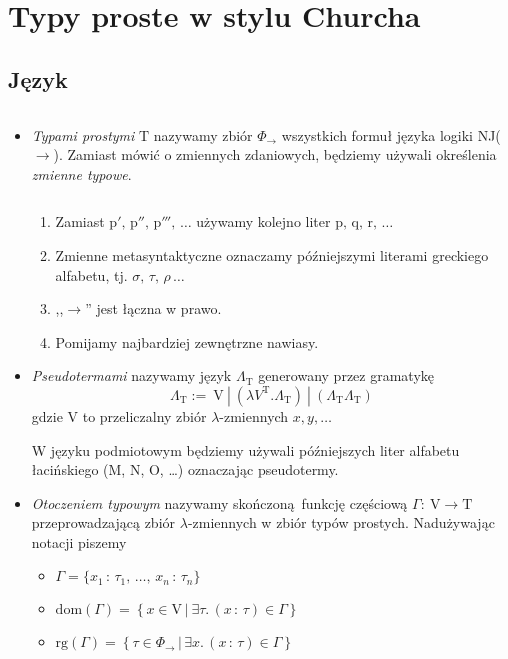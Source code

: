 \section{Typy proste w stylu Churcha}

\subsection{Język}

\begin{definicja}$ $\newline
\begin{itemize}
\item
  \emph{Typami prostymi} \(\mathrm{T}\) nazywamy zbiór \(\Phi_{\to}\) wszystkich formuł języka logiki NJ(\(\to\)). 
    Zamiast mówić o zmiennych zdaniowych, będziemy używali określenia \emph{zmienne typowe}.

\begin{konwencja*}$ $\newline 
  \begin{enumerate}
    \item Zamiast \(\mathrm{p'},\, \mathrm{p''},\, \mathrm{p'''},\, \dots\) używamy kolejno liter \(\mathrm{p},\, \mathrm{q},\, \mathrm{r},\, \dots\)
    \item Zmienne metasyntaktyczne oznaczamy późniejszymi literami greckiego alfabetu, tj. \(\sigma,\, \tau,\, \rho\,\dots\)
    \item ,,\(\rightarrow\)'' jest łączna w prawo.
    \item Pomijamy najbardziej zewnętrzne nawiasy.
  \end{enumerate}
\end{konwencja*}

\item
  \emph{Pseudotermami} nazywamy język \(\Lambda_{\mathrm{T}}\) generowany przez
gramatykę 
\[
  \Lambda_{\mathrm{T}} := \ \mathrm{V}\ | \ \left (\lambda V^{\mathrm{T}} . \Lambda_{\mathrm{T}}\right) \ | \ \left (\Lambda_{\mathrm{T}}\Lambda_{\mathrm{T}}\right)
\]
    gdzie V to przeliczalny zbiór \(\lambda\)-zmiennych \(x, y, \dots\)
    
    W języku podmiotowym będziemy używali późniejszych liter alfabetu łacińskiego (M, N, O, …) oznaczając pseudotermy.
  \item \emph{Otoczeniem typowym} nazywamy skończoną funkcję częściową \(\Gamma:\:\mathrm{V}\to\mathrm{T}\) przeprowadzającą zbiór \(\lambda\)-zmiennych w zbiór typów prostych. Nadużywając notacji piszemy
    \begin{itemize}
      \item \(\Gamma=\{x_1\,:\,\tau_1,\,\dots,\,x_n\,:\,\tau_n\}\)
      \item \(\mathrm{dom}(\Gamma) = \left\{x\in \mathrm{V}\,|\:\exists\tau.\,(x\,:\,\tau)\in\Gamma\right\}\)
      \item \(\mathrm{rg}(\Gamma)=\left\{\tau\in\Phi_{\to}\,|\,\exists x.\,(x\,:\,\tau)\in\Gamma\right\}\)
    \end{itemize}


\end{itemize}
\end{definicja}
